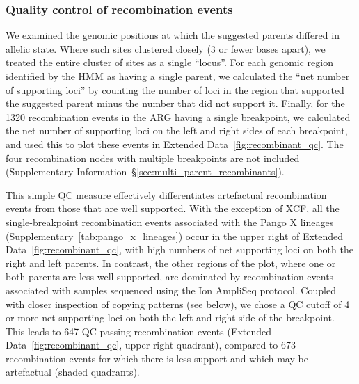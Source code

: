 \documentclass[12pt]{article}
\newcommand{\supref}[1]{Supplementary Information~\S\ref{#1}}
\newcommand{\edref}[1]{Extended Data~\ref{#1}}
\newcommand{\siref}[1]{Supplementary~\ref{#1}}
\begin{document}
\subsubsection*{Quality control of recombination events}

We examined the genomic positions
at which the suggested parents differed in allelic state.
Where such sites clustered closely (3 or fewer bases apart),
we treated the entire cluster of sites as a single ``locus''.
For each genomic region identified by the HMM as having a single parent,
we calculated the ``net number of supporting loci''
by counting the number of loci in the region
that supported the suggested parent minus the number that did not support it.
Finally, for the 1320 recombination events in the ARG having a single breakpoint,
we calculated the net number of supporting loci
on the left and right sides of each breakpoint, and
used this to plot these events in \edref{fig:recombinant_qc}.
The four recombination nodes with multiple breakpoints are not included
(\supref{sec:multi_parent_recombinants}).

This simple QC measure effectively differentiates
artefactual recombination events from those that are well supported.
With the exception of XCF,
all the single-breakpoint recombination events
associated with the Pango X lineages (\siref{tab:pango_x_lineages})
occur in the upper right of \edref{fig:recombinant_qc},
with high numbers of net supporting loci on both the right and left parents.
In contrast, the other regions of the plot,
where one or both parents are less well supported,
are dominated by recombination events associated with
samples sequenced using the Ion AmpliSeq protocol.
Coupled with closer inspection of copying patterns (see below),
we chose a QC cutoff of 4 or more net supporting loci
on both the left and right side of the breakpoint.
This leads to 647 QC-passing recombination events
(\edref{fig:recombinant_qc}, upper right quadrant),
compared to 673 recombination events
for which there is less support and which may be artefactual (shaded quadrants).
\end{document}
